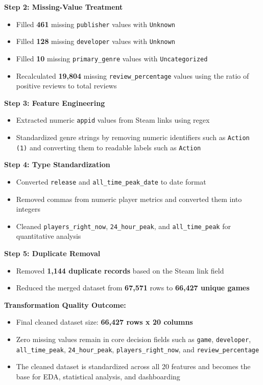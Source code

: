 \documentclass[12pt,a4paper]{report}
\begin{document}
\textbf{Step 2: Missing-Value Treatment}
\begin{itemize}
\item Filled \textbf{461} missing \texttt{publisher} values with \texttt{Unknown}
\item Filled \textbf{128} missing \texttt{developer} values with \texttt{Unknown}
\item Filled \textbf{10} missing \texttt{primary\_genre} values with \texttt{Uncategorized}
\item Recalculated \textbf{19,804} missing \texttt{review\_percentage} values using the ratio of positive reviews to total reviews
\end{itemize}

\textbf{Step 3: Feature Engineering}
\begin{itemize}
\item Extracted numeric \texttt{appid} values from Steam links using regex
\item Standardized genre strings by removing numeric identifiers such as \texttt{Action (1)} and converting them to readable labels such as \texttt{Action}
\end{itemize}

\textbf{Step 4: Type Standardization}
\begin{itemize}
\item Converted \texttt{release} and \texttt{all\_time\_peak\_date} to date format
\item Removed commas from numeric player metrics and converted them into integers
\item Cleaned \texttt{players\_right\_now}, \texttt{24\_hour\_peak}, and \texttt{all\_time\_peak} for quantitative analysis
\end{itemize}

\textbf{Step 5: Duplicate Removal}
\begin{itemize}
\item Removed \textbf{1,144 duplicate records} based on the Steam link field
\item Reduced the merged dataset from \textbf{67,571} rows to \textbf{66,427 unique games}
\end{itemize}

\textbf{Transformation Quality Outcome:}
\begin{itemize}
\item Final cleaned dataset size: \textbf{66,427 rows x 20 columns}
\item Zero missing values remain in core decision fields such as \texttt{game}, \texttt{developer}, \texttt{all\_time\_peak}, \texttt{24\_hour\_peak}, \texttt{players\_right\_now}, and \texttt{review\_percentage}
\item The cleaned dataset is standardized across all 20 features and becomes the base for EDA, statistical analysis, and dashboarding
\end{itemize}
\end{document}
